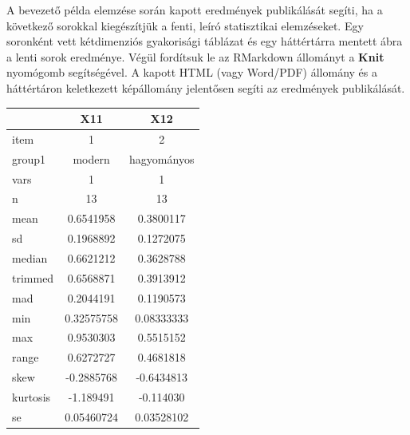 \documentclass[
]{book}
\newenvironment{Shaded}{\begin{snugshade}}{\end{snugshade}}
\newcommand{\AttributeTok}[1]{\textcolor[rgb]{0.77,0.63,0.00}{#1}}
\newcommand{\DecValTok}[1]{\textcolor[rgb]{0.00,0.00,0.81}{#1}}
\newcommand{\FunctionTok}[1]{\textcolor[rgb]{0.00,0.00,0.00}{#1}}
\newcommand{\NormalTok}[1]{#1}
\newcommand{\SpecialCharTok}[1]{\textcolor[rgb]{0.00,0.00,0.00}{#1}}
\newcommand{\StringTok}[1]{\textcolor[rgb]{0.31,0.60,0.02}{#1}}
\begin{document}
A bevezető példa elemzése során kapott eredmények publikálását segíti, ha a következő sorokkal kiegészítjük a fenti, leíró statisztikai elemzéseket. Egy soronként vett kétdimenziós gyakorisági táblázat és egy háttértárra mentett ábra a lenti sorok eredménye. Végül fordítsuk le az RMarkdown állományt a \textbf{Knit} nyomógomb segítségével. A kapott HTML (vagy Word/PDF) állomány és a háttértáron keletkezett képállomány jelentősen segíti az eredmények publikálását.

\begin{Shaded}
\end{Shaded}

\begin{tabular}{l|c|c}
\hline
  & X11 & X12\\
\hline
item & 1 & 2\\
\hline
group1 & modern & hagyományos\\
\hline
vars & 1 & 1\\
\hline
n & 13 & 13\\
\hline
mean & 0.6541958 & 0.3800117\\
\hline
sd & 0.1968892 & 0.1272075\\
\hline
median & 0.6621212 & 0.3628788\\
\hline
trimmed & 0.6568871 & 0.3913912\\
\hline
mad & 0.2044191 & 0.1190573\\
\hline
min & 0.32575758 & 0.08333333\\
\hline
max & 0.9530303 & 0.5515152\\
\hline
range & 0.6272727 & 0.4681818\\
\hline
skew & -0.2885768 & -0.6434813\\
\hline
kurtosis & -1.189491 & -0.114030\\
\hline
se & 0.05460724 & 0.03528102\\
\hline
\end{tabular}
\end{document}

